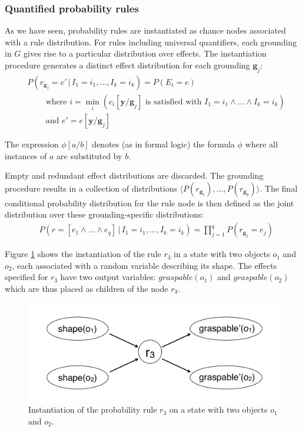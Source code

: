 \subsubsection*{Quantified probability rules}

As we have seen, probability rules are instantiated as chance nodes associated with a rule distribution.  For rules including universal quantifiers, each grounding in $G$ gives rise to a particular distribution over effects.  The instantiation procedure generates a distinct effect distribution for each grounding $\mathbf{g}_j$: 
\begin{align}
& P(r_{\mathbf{g}_j}\!=\!e' \, | \, I_1\!=\!i_1, \dots, I_k\!=\!i_k) = P(E_i = e) \label{eq:quantifruledistrib}
 \\
& \; \; \; \; \; \; \; \; \text{where } i = \min_i (c_i[\mathbf{y} / \mathbf{g}_j]\text{ is satisfied with } I_1\!=\!i_1 \land \dots \land I_k\!=\!i_k) \nonumber \\ 
& \; \; \; \; \; \; \; \; \text{and } e' = e [\mathbf{y} / \mathbf{g}_j] \nonumber
\end{align}

The expression $\phi[a/b]$ denotes (as in formal logic) the formula $\phi$ where all instances of $a$ are substituted by $b$.

Empty and redundant effect distributions are discarded. The grounding procedure results in a  collection of distributions $ \langle P(r_{\mathbf{g}_1}), \dots, P(r_{\mathbf{g}_p}) \rangle$.    The final conditional probability distribution for the rule node is then defined as the joint distribution over these grounding-specific distributions: 
\begin{align}
& P(r\!=\![e_1 \land \dots \land e_{q}] \, | \, I_1\!=\!i_1, \dots, I_k\!=\!i_k) = \prod_{j=1}^{q} P(r_{\mathbf{g}_j}\!=\!e_j)
\end{align}

Figure \ref{fig:quantinstantitionprob} shows the instantiation of the rule $r_3$ in a state with two objects $o_1$ and $o_2$, each associated with a random variable describing its shape. The effects specified for $r_3$ have two output variables: $\mathit{graspable}(o_1)$ and $\mathit{graspable}(o_2)$ which are thus placed as children of the node $r_3$.  

\begin{figure}[h]
\centering
\includegraphics[scale=0.25]{imgs/quantruleinstantiation.pdf}
\caption{Instantiation of the probability rule $r_3$ on a state with two objects $o_1$ and $o_2$.}
\label{fig:quantinstantitionprob}
\end{figure}

